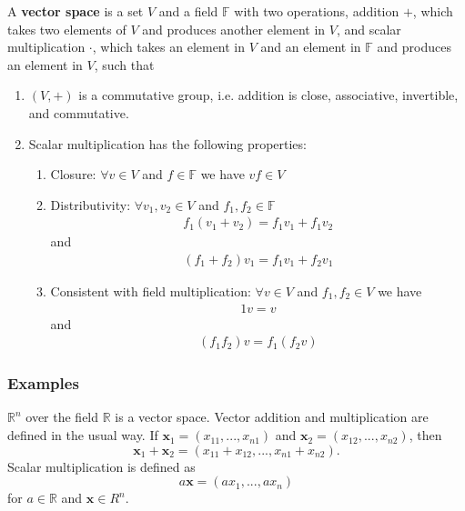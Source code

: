 \documentclass[compress]{beamer}
\def\F{\mathbb{F}}
\def\R{\mathbb{R}}
\theoremstyle{definition}
\begin{document}
\begin{frame}

\begin{definition}
  A \textbf{vector space} is a set $V$ and a field $\mathbb{F}$ with
  two operations, addition $+$, which takes two elements of $V$ and
  produces another element in $V$, and scalar multiplication $\cdot$,
  which takes an element in $V$ and an element in $\mathbb{F}$ and
  produces an element in $V$, such that
  \begin{enumerate}
  \item $(V, +)$ is a commutative group, i.e. addition is close,
    associative, invertible, and commutative.
  \item Scalar multiplication has the following properties:
    \begin{enumerate}
    \item Closure: $\forall v \in V$ and $f \in \F$ we have $vf \in V$
    \item Distributivity: $\forall v_1 , v_2 \in V$ and $f_1, f_2 \in
      \F$
      \begin{align*}
        f_1 (v_1 + v_2) = f_1 v_1 + f_1 v_2 
      \end{align*}
      and 
      \begin{align*}
        (f_1 + f_2)v_1 = f_1 v_1 + f_2 v_1
      \end{align*}
    \item Consistent with field multiplication: $\forall v \in V$ and
      $f_1, f_2 \in V$ we have
      \begin{align*}
        1 v = v
      \end{align*}
      and 
      \begin{align*}
        (f_1 f_2) v =f_1 (f_2 v)
      \end{align*}
    \end{enumerate}
  \end{enumerate}  
\end{definition}
\end{frame}

\subsubsection{Examples}
\begin{frame}
  \begin{example}\label{ex:Rn}
    $\R^n$ over the field $\R$ is a vector space.  Vector addition and
    multiplication are defined in the usual way. If $\mathbf{x}_1 =
    (x_{11}, ..., x_{n1})$ and $\mathbf{x}_2 = (x_{12}, ..., x_{n2})$,
    then
    \[ \mathbf{x}_1 + \mathbf{x}_2 = (x_{11}+x_{12}, ... , x_{n1} +
    x_{n2}). \]
    Scalar multiplication is defined as
    \[ a \mathbf{x} = (a x_1, ..., ax_n) \] for $a \in \R$ and
    $\mathbf{x} \in R^n$. 
  \end{example}
\end{frame}
\end{document}
